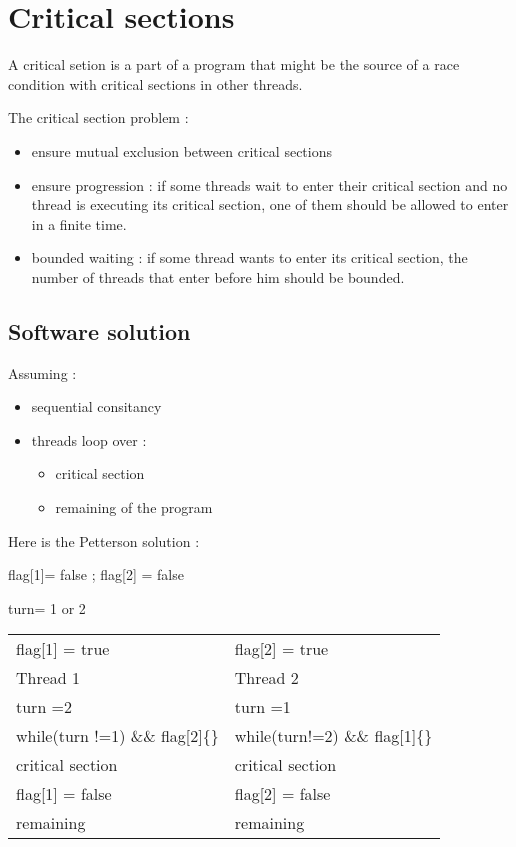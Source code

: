 \documentclass[a4paper,10pt]{article}
\begin{document}
\section{Critical sections}

A critical setion is a part of a program that might be the source of a race condition with critical sections in other threads.

The critical section problem :
\begin{itemize}
\item ensure mutual exclusion between critical sections
\item ensure progression : if some threads wait to enter their critical section and no thread is executing its critical section, one of them should be allowed to enter in a finite time.
\item bounded waiting : if some thread wants to enter its critical section, the number of threads that enter before him should be bounded. 
\end{itemize}

\subsection{Software solution}

Assuming :

\begin{itemize}
\item sequential consitancy
\item threads loop over :
\begin{itemize}
\item critical section
\item remaining of the program
\end{itemize}
\end{itemize}

Here is the Petterson solution :

\begin{centering}
flag[1]= false ; flag[2] = false

turn= 1 or 2

\begin{tabular}{|ll|}
\hline
	flag[1] = true & flag[2] = true\\
	Thread 1 & Thread 2 \\
	turn =2 & turn =1 \\
	while(turn !=1) \&\& flag[2]\{\} & while(turn!=2) \&\& flag[1]\{\}\\
	critical section & critical section\\
	flag[1] = false & flag[2] = false\\
	remaining & remaining\\
\hline
\end{tabular}

\end{centering}
\end{document}
